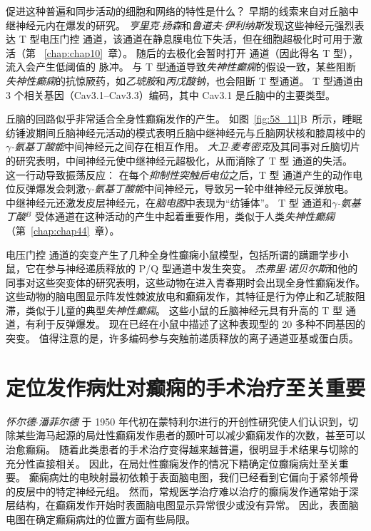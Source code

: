 促进这种普遍和同步活动的细胞和网络的特性是什么？
早期的线索来自对丘脑中继神经元内在爆发的研究。
\textit{亨里克$\cdot$扬森}和\textit{鲁道夫$\cdot$伊利纳斯}发现这些神经元强烈表达 T 型电压门控  通道，该通道在静息膜电位下失活，但在细胞超极化时可用于激活（第 ~\ref{chap:chap10}~章）。
随后的去极化会暂时打开  通道（因此得名 T 型）， 流入会产生低阈值的  脉冲。
与 T 型通道导致\textit{失神性癫痫}的假设一致，某些阻断\textit{失神性癫痫}的抗惊厥药，如\textit{乙琥胺}和\textit{丙戊酸钠}，也会阻断 T 型通道。
T 型通道由 3 个相关基因（Cav3.1–Cav3.3）编码，其中 Cav3.1 是丘脑中的主要类型。


丘脑的回路似乎非常适合全身性癫痫发作的产生。
如图~\ref{fig:58_11}B~所示，睡眠纺锤波期间丘脑神经元活动的模式表明丘脑中继神经元与丘脑网状核和膝周核中的\textit{$\gamma$-氨基丁酸能}中间神经元之间存在相互作用。
\textit{大卫$\cdot$麦考密克}及其同事对丘脑切片的研究表明，中间神经元使中继神经元超极化，从而消除了 T 型  通道的失活。
这一行动导致振荡反应：
在每个\textit{抑制性突触后电位}之后，T 型  通道产生的动作电位反弹爆发会刺激\textit{$\gamma$-氨基丁酸能}中间神经元，导致另一轮中继神经元反弹放电。
中继神经元还激发皮层神经元，在\textit{脑电图}中表现为“纺锤体”。
T 型  通道和\textit{$\gamma$-氨基丁酸}$^B$ 受体通道在这种活动的产生中起着重要作用，类似于人类\textit{失神性癫痫}（第~\ref{chap:chap44}~章）。


电压门控  通道的突变产生了几种全身性癫痫小鼠模型，包括所谓的蹒跚学步小鼠，它在参与神经递质释放的 P/Q 型通道中发生突变。
\textit{杰弗里$\cdot$诺贝尔斯}和他的同事对这些突变体的研究表明，这些动物在进入青春期时会出现全身性癫痫发作。
这些动物的脑电图显示阵发性棘波放电和癫痫发作，其特征是行为停止和乙琥胺阻滞，类似于儿童的典型\textit{失神性癫痫}。
这些小鼠的丘脑神经元具有升高的 T 型  通道，有利于反弹爆发。
现在已经在小鼠中描述了这种表现型的 20 多种不同基因的突变。
值得注意的是，许多编码参与突触前递质释放的离子通道亚基或蛋白质。



\section{定位发作病灶对癫痫的手术治疗至关重要}

\textit{怀尔德$\cdot$潘菲尔德 }于 1950 年代初在蒙特利尔进行的开创性研究使人们认识到，切除某些海马起源的局灶性癫痫发作患者的颞叶可以减少癫痫发作的次数，甚至可以治愈癫痫。
随着此类患者的手术治疗变得越来越普遍，很明显手术结果与切除的充分性直接相关。
因此，在局灶性癫痫发作的情况下精确定位癫痫病灶至关重要。
癫痫病灶的电映射最初依赖于表面脑电图，我们已经看到它偏向于紧邻颅骨的皮层中的特定神经元组。
然而，常规医学治疗难以治疗的癫痫发作通常始于深层结构，在癫痫发作开始时表面脑电图显示异常很少或没有异常。
因此，表面脑电图在确定癫痫病灶的位置方面有些局限。



